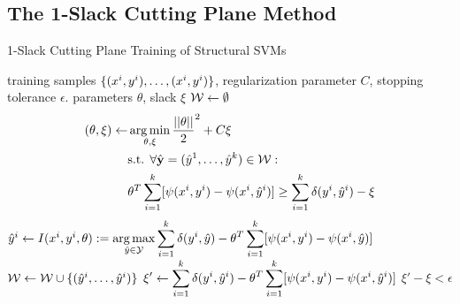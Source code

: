 \subsection{The 1-Slack Cutting Plane Method}

\begin{algorithm*}[t]
    \caption{1-Slack Cutting Plane Training of Structural SVMs \label{alg_one_slack}}
    \begin{algorithmic}[1]
        \Require training samples $\{ (x^{i}, y^{i}), \dots, (x^{i}, y^{i})\}$, regularization parameter $C$, stopping tolerance $\epsilon$.
        \Ensure parameters $\theta$, slack $\xi$
        \State $\mathcal{W} \leftarrow \emptyset$
        \Repeat
            \State 
            \vspace{-5mm}
            \begin{align*}
            (\theta, \xi) \leftarrow \displaystyle &\operatorname*{arg\,min}_{\theta, \xi} \frac{||\theta||}{2}^2 + C \xi\\
            &\text{s.t. }\forall \hat{\mathbf{y}}=(\hat{y}^{1}, \dots, \hat{y}^{k}) \in \mathcal{W}:\\
            &\theta^T \sum_{i=1}^k [\psi(x^{i}, y^{i}) - \psi(x^{i}, \hat{y}^{i})] \geq \sum_{i=1}^k \delta(y^{i}, \hat{y}^{i}) - \xi
            \end{align*}
                \State
                $\hat{y}^{i} \leftarrow I(x^{i}, y^{i}, \theta) := \displaystyle \operatorname*{arg\,max}_{\hat{y}\in\mathcal{Y}} \sum_{i=1}^k \delta(y^{i}, \hat{y}) - \theta^T \sum_{i=1}^k [\psi(x^{i}, y^{i}) - \psi(x^{i}, \hat{y})]$ \label{get_cutting_plane}
            \EndFor
            \State $\mathcal{W} \leftarrow \mathcal{W} \cup \{ (\hat{y}^{i}, \dots, \hat{y}^{i}) \} $
            \State $ \displaystyle \xi' \leftarrow  \sum_{i=1}^k \delta(y^{i}, \hat{y}^{i}) - \theta^T \sum_{i=1}^k [\psi(x^{i}, y^{i}) - \psi(x^{i}, \hat{y}^{i})] $
        \Until $\xi' - \xi < \epsilon$ \label{convergence_check}
    \end{algorithmic}
\end{algorithm*}

